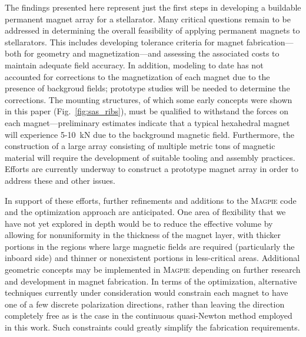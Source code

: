 \documentclass[11pt,onecolumn]{article}
\begin{document}
The findings presented here represent just the first steps in developing a
buildable permanent magnet array for a stellarator. Many critical questions
remain to be addressed in determining the overall feasibility of applying
permanent magnets to stellarators. This includes developing tolerance
criteria for magnet fabrication---both for geometry and magnetization---and 
assessing the associated costs to maintain adequate field accuracy.
In addition, modeling to date has not accounted for corrections to the
magnetization of each magnet due to the presence of backgroud fields; 
prototype studies will be needed to determine the corrections.
The mounting structures, of which some early concepts were shown in
this paper (Fig.~\ref{fig:sas_ribs}), must be qualified to withstand the
forces on each magnet---preliminary estimates indicate that a typical
hexahedral magnet will experience 5-10~kN due to the background magnetic field.
Furthermore, the construction of a large array consisting of multiple metric 
tons of magnetic material will require the development of suitable tooling and
assembly practices.
Efforts are currently underway to construct a prototype magnet array
in order to address these and other issues.

In support of these efforts, further refinements and additions to 
the \textsc{Magpie} code and the optimization approach are 
anticipated. One area of flexibility that we have
not yet explored in depth would be to reduce the effective volume by allowing
for nonuniformity in the thickness of the magnet layer, with thicker 
portions in the regions where large magnetic fields are required (particularly 
the inboard side) and thinner or nonexistent portions in less-critical areas.
Additional geometric concepts may be implemented in \textsc{Magpie} depending
on further research and development in magnet fabrication. 
In terms of the optimization, alternative techniques currently under
consideration would constrain each magnet to have one of a few discrete
polarization directions, rather than leaving the direction completely free
as is the case in the continuous quasi-Newton method employed in this work. 
Such constraints could greatly simplify the fabrication requirements.
\end{document}
